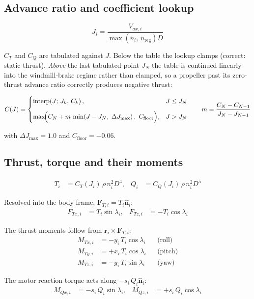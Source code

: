 \documentclass[11pt,a4paper]{article}
\newcommand{\vect}[1]{\bm{#1}}
\newcommand{\unit}[1]{\hat{\bm{#1}}}
\newcommand{\interp}{\operatorname{interp}}
\begin{document}
\subsection{Advance ratio and coefficient lookup}
\begin{equation}
J_i=\frac{V_{ax,i}}{\max\!\left(n_i,\,n_{\mathrm{reg}}\right)D}
\end{equation}

$C_T$ and $C_Q$ are tabulated against $J$. Below the table the lookup clamps
(correct: static thrust). \emph{Above} the last tabulated point $J_N$ the table
is continued linearly into the windmill-brake regime rather than clamped, so a
propeller past its zero-thrust advance ratio correctly produces negative thrust:

\begin{equation}
C(J)=
\begin{cases}
\interp\!\left(J;\,J_k,\,C_k\right), & J\le J_N\\[3mm]
\max\!\Bigl(C_N+m\,\min\!\left(J-J_N,\ \Delta J_{\max}\right),\ C_{\mathrm{floor}}\Bigr), & J>J_N
\end{cases}
\qquad
m=\frac{C_N-C_{N-1}}{J_N-J_{N-1}}
\end{equation}

with $\Delta J_{\max}=1.0$ and $C_{\mathrm{floor}}=-0.06$.

\subsection{Thrust, torque and their moments}
\begin{align}
T_i&=C_T(J_i)\,\rho\,n_i^{2}D^{4}, &
Q_i&=C_Q(J_i)\,\rho\,n_i^{2}D^{5}
\end{align}

Resolved into the body frame, $\vect F_{T,i}=T_i\unit n_i$:
\begin{align}
F_{Tx,i}&=T_i\sin\lambda_i, &
F_{Tz,i}&=-T_i\cos\lambda_i
\end{align}

The thrust moments follow from $\vect r_i\times\vect F_{T,i}$:
\begin{align}
M_{Tx,i}&=-y_i\,T_i\cos\lambda_i &&\text{(roll)}\\
M_{Ty,i}&=+x_i\,T_i\cos\lambda_i &&\text{(pitch)}\\
M_{Tz,i}&=-y_i\,T_i\sin\lambda_i &&\text{(yaw)}
\end{align}

The motor reaction torque acts along $-s_i\,Q_i\unit n_i$:
\begin{align}
M_{Qx,i}&=-s_i\,Q_i\sin\lambda_i, &
M_{Qz,i}&=+s_i\,Q_i\cos\lambda_i
\end{align}
\end{document}
